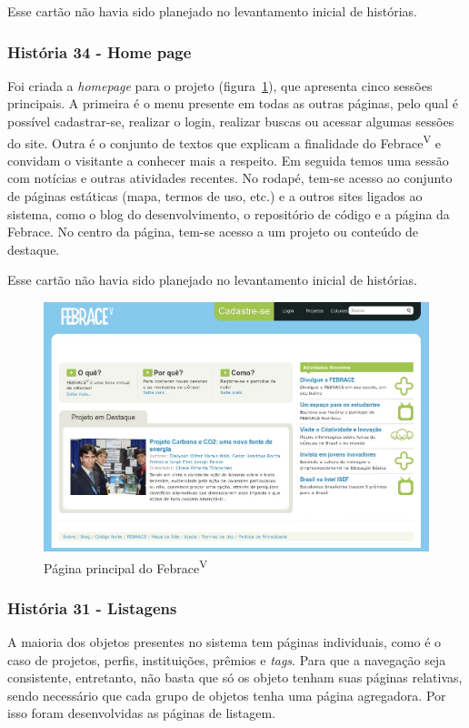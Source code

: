   Esse cartão não havia sido planejado no levantamento inicial de histórias.

    \subsubsection{História 34 - Home page}
      Foi criada a \textit{homepage} para o projeto (figura~\ref{homepage}), que apresenta cinco sessões principais. A primeira é o menu presente em todas as outras páginas, pelo qual é possível cadastrar-se, realizar o login, realizar buscas ou acessar algumas sessões do site. Outra é o conjunto de textos que explicam a finalidade do Febrace\textsuperscript{V} e convidam o visitante a conhecer mais a respeito. Em seguida temos uma sessão com notícias e outras atividades recentes. No rodapé, tem-se acesso ao conjunto de páginas estáticas (mapa, termos de uso, etc.) e a outros sites ligados ao sistema, como o blog do desenvolvimento, o repositório de código e a página da Febrace. No centro da página, tem-se acesso a um projeto ou conteúdo de destaque.

  Esse cartão não havia sido planejado no levantamento inicial de histórias.

    \begin{figure}
        \begin{center}
    \includegraphics[width=0.7\linewidth]{arquivos/home.png}
        \end{center}
        \caption{Página principal do Febrace\textsuperscript{V}}
        \label{homepage}
    \end{figure}

    \subsubsection{História 31 - Listagens}
      A maioria dos objetos presentes no sistema tem páginas individuais, como é o caso de projetos, perfis, instituições, prêmios e \textit{tags}. Para que a navegação seja consistente, entretanto, não basta que só os objeto tenham suas páginas relativas, sendo necessário que cada grupo de objetos tenha uma página agregadora. Por isso foram desenvolvidas as páginas de listagem.

